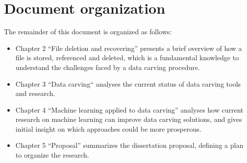 \section{Document organization}
The remainder of this document is organized as follows:

\begin{itemize}
    \item Chapter 2 ``File deletion and recovering'' presents a brief overview of how a file is stored, referenced and deleted, which is a fundamental knowledge to understand the challenges faced by a data carving procedure.

    \item Chapter 3 ``Data carving`` analyses the current status of data carving tools and research.

    \item Chapter 4 ``Machine learning applied to data carving'' analyses how current research on machine learning can improve data carving solutions, and gives initial insight on which approaches could be more prosperous.

    \item Chapter 5 ``Proposal'' summarizes the dissertation proposal, defining a plan to organize the research.
\end{itemize}

